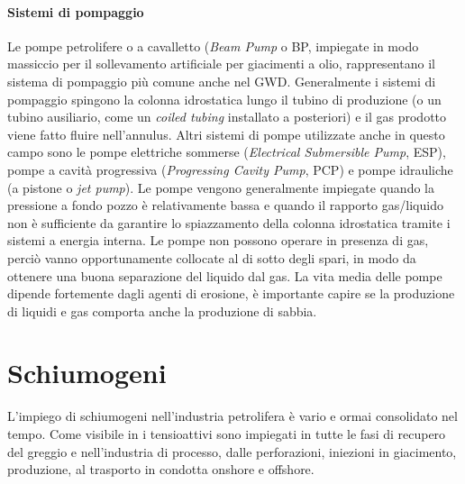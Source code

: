 \paragraph{Sistemi di pompaggio}
Le pompe petrolifere o a cavalletto (\textit{Beam Pump} o BP, impiegate in modo massiccio per il sollevamento artificiale per giacimenti a olio, rappresentano il sistema di pompaggio più comune anche nel GWD. Generalmente i sistemi di pompaggio spingono la colonna idrostatica lungo il tubino di produzione (o un tubino ausiliario, come un \textit{coiled tubing} installato a posteriori) e il gas prodotto viene fatto fluire nell'annulus. Altri sistemi di pompe utilizzate anche in questo campo sono le pompe elettriche sommerse (\textit{Electrical Submersible Pump},   ESP), pompe a cavità progressiva (\textit{Progressing Cavity Pump}, PCP) e pompe idrauliche (a pistone o \textit{jet pump}). Le pompe vengono generalmente impiegate quando la pressione a fondo pozzo è relativamente bassa e quando il rapporto gas/liquido non è sufficiente da garantire lo spiazzamento della colonna idrostatica tramite i sistemi a energia interna. Le pompe non possono operare in presenza di gas, perciò vanno opportunamente collocate al di sotto degli spari, in modo da ottenere una buona separazione del liquido dal gas. La vita media delle pompe dipende fortemente dagli agenti di erosione, è importante capire se la produzione di liquidi e gas comporta anche la produzione di sabbia.

\section{Schiumogeni}
L'impiego di schiumogeni nell'industria petrolifera è vario e ormai consolidato nel tempo. Come visibile in  i tensioattivi sono impiegati in tutte le fasi di recupero del greggio e nell'industria di processo, dalle perforazioni, iniezioni in giacimento, produzione, al trasporto in condotta onshore e offshore.

